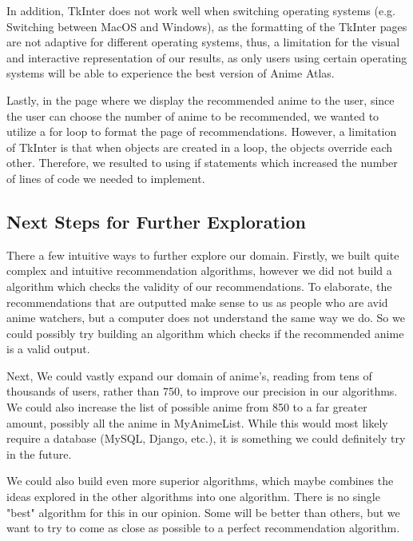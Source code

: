 \documentclass[fontsize=11pt]{article}
\begin{document}
\item[]In addition, TkInter does not work well when switching operating systems (e.g. Switching between MacOS and Windows), as the formatting of the TkInter pages are not adaptive for different operating systems, thus, a limitation for the visual and interactive representation of our results, as only users using certain operating systems will be able to experience the best version of Anime Atlas.

\item[]Lastly, in the page where we display the recommended anime to the user, since the user can choose the number of anime to be recommended, we wanted to utilize a for loop to format the page of recommendations. However, a limitation of TkInter is that when objects are created in a loop, the objects override each other. Therefore, we resulted to using if statements which increased the number of lines of code we needed to implement.


\subsection{Next Steps for Further Exploration}

\item[]There a few intuitive ways to further explore our domain. Firstly, we built quite complex and intuitive recommendation algorithms, however we did not build a algorithm which checks the validity of our recommendations. To elaborate, the recommendations that are outputted make sense to us as people who are avid anime watchers, but a computer does not understand the same way we do. So we could possibly try building an algorithm which checks if the recommended anime is a valid output. 

\item[]Next, We could vastly expand our domain of anime's, reading from tens of thousands of users, rather than 750, to improve our precision in our algorithms. We could also increase the list of possible anime from 850 to a far greater amount, possibly all the anime in MyAnimeList. While this would most likely require a database (MySQL, Django, etc.), it is something we could definitely try in the future. 

\item[]We could also build even more superior algorithms, which maybe combines the ideas explored in the other algorithms into one algorithm. There is no single "best" algorithm for this in our opinion. Some will be better than others, but we want to try to come as close as possible to a perfect recommendation algorithm. 
\end{document}
